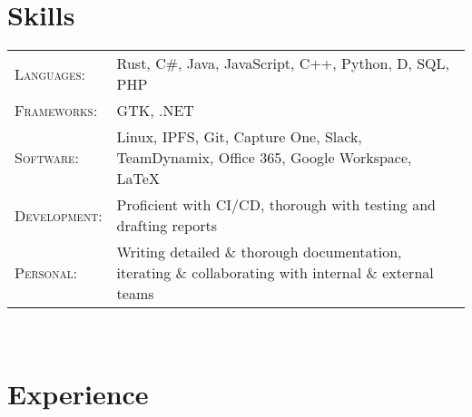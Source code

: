 \documentclass[letterpaper,8pt]{article} %
\begin{document}

\section{Skills}

\footnotesize{\begin{tabular}{ll}
\textsc{Languages}: & Rust, C\#, Java, JavaScript, C++, Python, D, SQL, PHP\\
\textsc{Frameworks}: & GTK, .NET\\
\textsc{Software}: & Linux, IPFS, Git, Capture One, Slack, TeamDynamix, Office 365, Google Workspace, \LaTeX\\
\textsc{Development}: & Proficient with CI/CD, thorough with testing and drafting reports\\
\textsc{Personal}: & Writing detailed \& thorough documentation, iterating \& collaborating with internal \& external teams

\end{tabular}}\normalsize\\


\section{Experience}
\end{document}
